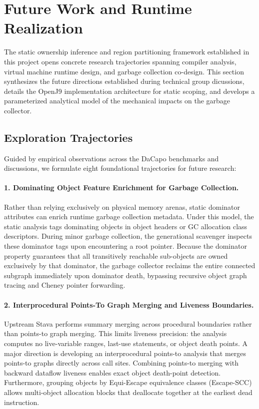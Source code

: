 \documentclass[12pt,a4paper]{article}
\begin{document}

\section{Future Work and Runtime Realization}
\label{sec:future}

The static ownership inference and region partitioning framework established in this project opens concrete research trajectories spanning compiler analysis, virtual machine runtime design, and garbage collection co-design. This section synthesizes the future directions established during technical group dicussions, details the OpenJ9 implementation architecture for static scoping, and develops a parameterized analytical model of the mechanical impacts on the garbage collector.

\subsection{Exploration Trajectories}
\label{sec:future-trajectories}

Guided by empirical observations across the DaCapo benchmarks and discussions, we formulate eight foundational trajectories for future research:

\paragraph{1. Dominating Object Feature Enrichment for Garbage Collection.}
Rather than relying exclusively on physical memory arenas, static dominator attributes can enrich runtime garbage collection metadata. Under this model, the static analysis tags dominating objects in object headers or GC allocation class descriptors. During minor garbage collection, the generational scavenger inspects these dominator tags upon encountering a root pointer. Because the dominator property guarantees that all transitively reachable sub-objects are owned exclusively by that dominator, the garbage collector reclaims the entire connected subgraph immediately upon dominator death, bypassing recursive object graph tracing and Cheney pointer forwarding.

\paragraph{2. Interprocedural Points-To Graph Merging and Liveness Boundaries.}
Upstream Stava performs summary merging across procedural boundaries rather than points-to graph merging. This limits liveness precision: the analysis computes no live-variable ranges, last-use statements, or object death points. A major direction is developing an interprocedural points-to analysis that merges points-to graphs directly across call sites. Combining points-to merging with backward dataflow liveness enables exact object death-point detection. Furthermore, grouping objects by Equi-Escape equivalence classes (Escape-SCC) allows multi-object allocation blocks that deallocate together at the earliest dead instruction.
\end{document}
